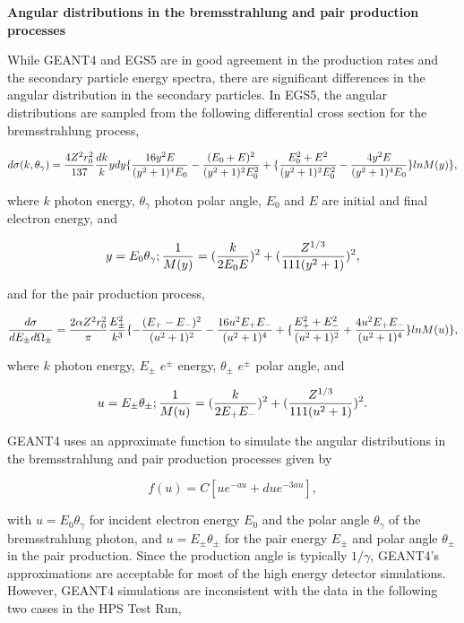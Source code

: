\vspace{1cm}
\noindent
{\bf Angular distributions in the bremsstrahlung and pair production processes}

While GEANT4 and EGS5 are in good agreement in the production rates and the secondary particle
energy spectra, there are significant differences in the angular distribution in the secondary
particles. In EGS5, the angular distributions are sampled from the following differential
cross section for the bremsstrahlung process, \cite{koch}

$$d\sigma(k,\theta_\gamma) = {{4Z^2r_0^2} \over 137} {dk \over k} ydy\{{{16y^2E} \over 
{(y^2+1)^4E_0}}
 -{{(E_0+E)^2} \over {(y^2+1)^2E_0^2}}+\{{{E_0^2+E^2} \over {(y^2+1)^2E_0^2}} -
 {{4y^2E} \over {(y^2+1)^4E_0}}\} lnM(y) \}, $$

\noindent
where $k$ photon energy, $\theta_\gamma$ photon polar angle, $E_0$ and $E$ are initial and final 
electron energy, and

$$y=E_0\theta_\gamma; {1 \over {M(y)}} = ({k \over {2E_0E}})^2 + ({{Z^{1/3}} \over {111(y^2+1)}})^2, $$

\noindent
and for the pair production process, \cite{motz}

$${{d\sigma} \over {dE_\pm d\Omega_\pm}} = {{2\alpha Z^2r_0^2} \over \pi} {E_\pm^2 \over k^3}
\{-{{(E_+-E_-)^2} \over {(u^2+1)^2}}-{{16u^2E_+E_-} \over {(u^2+1)^4}} + \{ {{E_+^2+E_-^2} \over
{(u^2+1)^2}} + {{4u^2E_+E_-} \over {(u^2+1)^4}} \} lnM(u)\},$$

\noindent
where $k$ photon energy, $E_\pm$ $e^{\pm}$ energy, $\theta_\pm$ $e^{\pm}$ polar angle, and

$$u=E_\pm\theta_\pm; {1 \over {M(u)}} = ({k \over {2E_+E_-}})^2+({Z^{1/3} \over {111(u^2+1)}})^2.$$

\noindent
GEANT4 uses an approximate function to simulate the angular distributions in the 
bremsstrahlung and pair production processes given by

$$ f(u) = C [ue^{-au} + d u e^{-3au}], $$

\noindent
with $u=E_0\theta_\gamma$ for incident electron energy $E_0$ and the polar angle 
$\theta_\gamma$ of the bremsstrahlung photon, and $u=E_{\pm}\theta_{\pm}$ for the pair 
energy $E_\pm$ and polar angle $\theta_\pm$ in the pair production. Since the production angle
is typically $1/\gamma$, GEANT4's approximations are acceptable
for most of the high energy detector simulations. However, GEANT4
simulations are inconsistent with the data in the following two cases in the HPS Test Run,

